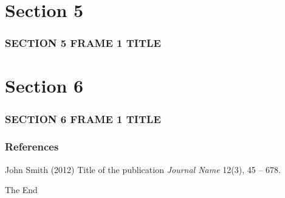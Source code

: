 \documentclass{beamer}
\begin{document}
\section{Section 5}
\begin{frame}
\frametitle{SECTION 5 FRAME 1 TITLE}
\end{frame}




\section{Section 6}
\begin{frame}
\frametitle{SECTION 6 FRAME 1 TITLE}
\end{frame}




\begin{frame}
\frametitle{References}
\footnotesize{
\begin{thebibliography}{99} %
 John Smith (2012)
\newblock Title of the publication
\newblock \emph{Journal Name} 12(3), 45 -- 678.
\end{thebibliography}
}
\end{frame}


\begin{frame}
\Huge{\centerline{The End}}
\end{frame}

\end{document}
